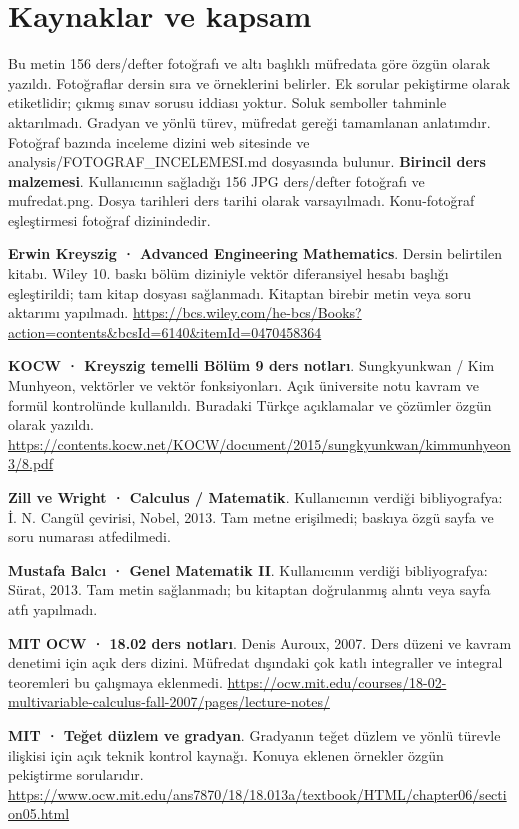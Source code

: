 \section*{Kaynaklar ve kapsam}
Bu metin 156 ders/defter fotoğrafı ve altı başlıklı müfredata göre özgün olarak yazıldı. Fotoğraflar dersin sıra ve örneklerini belirler. Ek sorular pekiştirme olarak etiketlidir; çıkmış sınav sorusu iddiası yoktur. Soluk semboller tahminle aktarılmadı. Gradyan ve yönlü türev, müfredat gereği tamamlanan anlatımdır. Fotoğraf bazında inceleme dizini web sitesinde ve analysis/FOTOGRAF\_INCELEMESI.md dosyasında bulunur.
\textbf{Birincil ders malzemesi}. Kullanıcının sağladığı 156 JPG ders/defter fotoğrafı ve mufredat.png. Dosya tarihleri ders tarihi olarak varsayılmadı. Konu-fotoğraf eşleştirmesi fotoğraf dizinindedir.\par
\textbf{Erwin Kreyszig · Advanced Engineering Mathematics}. Dersin belirtilen kitabı. Wiley 10. baskı bölüm diziniyle vektör diferansiyel hesabı başlığı eşleştirildi; tam kitap dosyası sağlanmadı. Kitaptan birebir metin veya soru aktarımı yapılmadı.
{\footnotesize\url{https://bcs.wiley.com/he-bcs/Books?action=contents&bcsId=6140&itemId=0470458364}}\par
\textbf{KOCW · Kreyszig temelli Bölüm 9 ders notları}. Sungkyunkwan / Kim Munhyeon, vektörler ve vektör fonksiyonları. Açık üniversite notu kavram ve formül kontrolünde kullanıldı. Buradaki Türkçe açıklamalar ve çözümler özgün olarak yazıldı.
{\footnotesize\url{https://contents.kocw.net/KOCW/document/2015/sungkyunkwan/kimmunhyeon3/8.pdf}}\par
\textbf{Zill ve Wright · Calculus / Matematik}. Kullanıcının verdiği bibliyografya: İ. N. Cangül çevirisi, Nobel, 2013. Tam metne erişilmedi; baskıya özgü sayfa ve soru numarası atfedilmedi.\par
\textbf{Mustafa Balcı · Genel Matematik II}. Kullanıcının verdiği bibliyografya: Sürat, 2013. Tam metin sağlanmadı; bu kitaptan doğrulanmış alıntı veya sayfa atfı yapılmadı.\par
\textbf{MIT OCW · 18.02 ders notları}. Denis Auroux, 2007. Ders düzeni ve kavram denetimi için açık ders dizini. Müfredat dışındaki çok katlı integraller ve integral teoremleri bu çalışmaya eklenmedi.
{\footnotesize\url{https://ocw.mit.edu/courses/18-02-multivariable-calculus-fall-2007/pages/lecture-notes/}}\par
\textbf{MIT · Teğet düzlem ve gradyan}. Gradyanın teğet düzlem ve yönlü türevle ilişkisi için açık teknik kontrol kaynağı. Konuya eklenen örnekler özgün pekiştirme sorularıdır.
{\footnotesize\url{https://www.ocw.mit.edu/ans7870/18/18.013a/textbook/HTML/chapter06/section05.html}}\par

